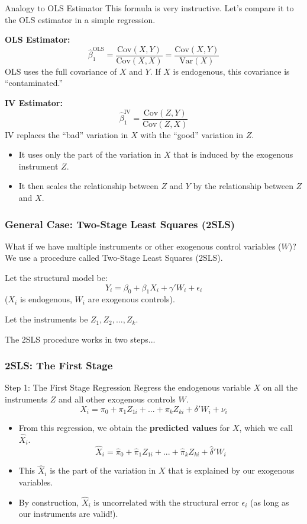 \documentclass[
  ignorenonframetext,
  aspectratio=169]{beamer}
\newcommand{\Cov}{\text{Cov}}
\newcommand{\Var}{\text{Var}}
\begin{document}
\begin{frame}{Analogy to OLS Estimator}
\label{analogy-to-ols-estimator}
This formula is very instructive. Let's compare it to the OLS estimator
in a simple regression.

\textbf{OLS Estimator:}
\[ \hat{\beta}_1^{\text{OLS}} = \frac{\Cov(X, Y)}{\Cov(X, X)} = \frac{\Cov(X, Y)}{\Var(X)} \]
OLS uses the full covariance of \(X\) and \(Y\). If \(X\) is endogenous,
this covariance is ``contaminated.''

\textbf{IV Estimator:}
\[ \hat{\beta}_1^{\text{IV}} = \frac{\Cov(Z, Y)}{\Cov(Z, X)} \] IV
replaces the ``bad'' variation in \(X\) with the ``good'' variation in
\(Z\).

\begin{itemize}
    \item It uses only the part of the variation in $X$ that is induced by the exogenous instrument $Z$.
    \item It then scales the relationship between $Z$ and $Y$ by the relationship between $Z$ and $X$.
\end{itemize}

\begin{frame}
\frametitle{General Case: Two-Stage Least Squares (2SLS)}
What if we have multiple instruments or other exogenous control variables ($W$)? We use a procedure called Two-Stage Least Squares (2SLS).

Let the structural model be:
\[ Y_i = \beta_0 + \beta_1 X_i + \gamma' W_i + \epsilon_i \]
($X_i$ is endogenous, $W_i$ are exogenous controls).

Let the instruments be $Z_1, Z_2, ..., Z_k$.

The 2SLS procedure works in two steps...
\end{frame}

\begin{frame}
\frametitle{2SLS: The First Stage}
\begin{block}{Step 1: The First Stage Regression}
Regress the endogenous variable $X$ on all the instruments $Z$ and all other exogenous controls $W$.
\[ X_i = \pi_0 + \pi_1 Z_{1i} + ... + \pi_k Z_{ki} + \delta' W_i + \nu_i \]
\end{block}
\pause
\begin{itemize}
    \item From this regression, we obtain the \textbf{predicted values} for $X$, which we call $\hat{X}_i$.
    \[ \hat{X}_i = \hat{\pi}_0 + \hat{\pi}_1 Z_{1i} + ... + \hat{\pi}_k Z_{ki} + \hat{\delta}' W_i \]
    \item This $\hat{X}_i$ is the part of the variation in $X$ that is explained by our exogenous variables.
    \item By construction, $\hat{X}_i$ is uncorrelated with the structural error $\epsilon_i$ (as long as our instruments are valid!).
\end{itemize}
\end{frame}


\end{frame}
\end{document}
